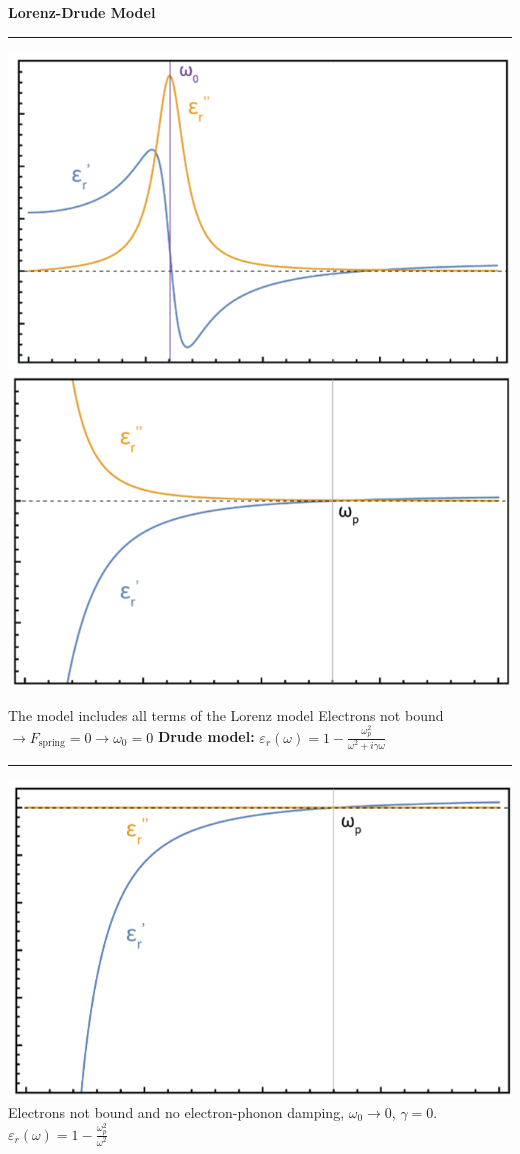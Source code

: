 {	\vspace{2mm}
	\normalsize\textbf{Lorenz-Drude Model}\small
	\hrule
	\vspace{2mm}
	\begin{myCenter}
		\includegraphics[align=t, width=0.45\linewidth]{01_assets/02_Electric_permittivity_dialectric.png}
		\includegraphics[align=t, width=0.45\linewidth]{01_assets/02_Electric_permittivity_metal.png}
	\end{myCenter}
	\begin{multicols*}{2}
		The model includes all terms of the Lorenz model\newline
		\columnbreak
		Electrons not bound $\rightarrow F_\text{spring} = 0 \rightarrow \omega_0 = 0$
		\textbf{Drude model:}\newline
		$\varepsilon_r(\omega) = 1 - \frac{\omega_p^2}{\omega^2 + i\gamma\omega}$
	\end{multicols*}
	\hrule
	\begin{multicols*}{2}
		\includegraphics[align=t, width=\linewidth]{01_assets/02_Electric_permittivity_plasma.png}
		\columnbreak\newline
		Electrons not bound and no electron-phonon damping, $\omega_0 \rightarrow 0$, $\gamma = 0$.\newline
		$\varepsilon_r(\omega) = 1 - \frac{\omega_p^2}{\omega^2}$
	\end{multicols*}

}
